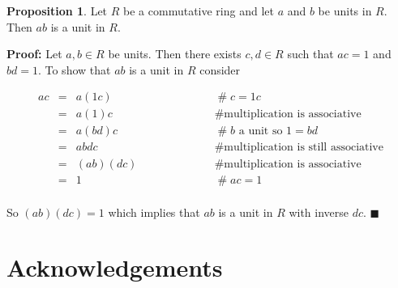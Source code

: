 \documentclass[11pt, oneside]{article}   	%
\theoremstyle{definition}
\newtheorem{proposition}{Proposition}[section]
\begin{document}
\bigskip


\begin{proposition}
Let $R$ be a commutative ring and let $a$ and $b$ be units in
$R$. Then $ab$ is a unit in $R$. 
\end{proposition}

\noindent
\textbf{Proof:} Let $a, b \in R$ be units. Then there exists $c,
d \in R$ such that $ac = 1$ and $bd = 1$. To show that $ab$ is a
unit in $R$ consider


\begin{equation*}
\begin{array}{rlll} 
ac
&=&  a(1c)              &\qquad\qquad\qquad \mathrel{\#} c = 1 c \\
&=&  a(1)c              &\qquad\qquad\qquad \mathrel{\#} \text{multiplication is associative} \\
&=&  a(bd)c             &\qquad\qquad\qquad \mathrel{\#} \text{$b$ a unit so $1 = bd$} \\
&=&  abdc               &\qquad\qquad\qquad \mathrel{\#} \text{multiplication is still associative} \\
&=&  (ab)(dc)           &\qquad\qquad\qquad \mathrel{\#} \text{multiplication is associative} \\
&=&  1                  &\qquad\qquad\qquad \mathrel{\#} ac = 1 \\
\end{array}
\end{equation*}

\bigskip
\noindent
So $(ab)(dc) = 1$ which implies that $ab$ is a unit in $R$ with
inverse $dc$. $\blacksquare$ 


\section{Acknowledgements}



\end{document}
